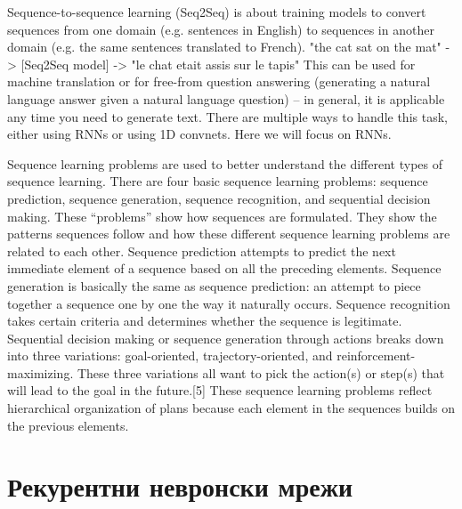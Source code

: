 Sequence-to-sequence learning (Seq2Seq) is about training models to convert sequences from one domain (e.g. sentences in English) to sequences in another domain (e.g. the same sentences translated to French).
"the cat sat on the mat" -> [Seq2Seq model] -> "le chat etait assis sur le tapis"
This can be used for machine translation or for free-from question answering (generating a natural language answer given a natural language question) -- in general, it is applicable any time you need to generate text. There are multiple ways to handle this task, either using RNNs or using 1D convnets. Here we will focus on RNNs.

Sequence learning problems are used to better understand the different types of sequence learning. There are four basic sequence learning problems: sequence prediction, sequence generation, sequence recognition, and sequential decision making. These “problems” show how sequences are formulated. They show the patterns sequences follow and how these different sequence learning problems are related to each other.
Sequence prediction attempts to predict the next immediate element of a sequence based on all the preceding elements. Sequence generation is basically the same as sequence prediction: an attempt to piece together a sequence one by one the way it naturally occurs. Sequence recognition takes certain criteria and determines whether the sequence is legitimate. Sequential decision making or sequence generation through actions breaks down into three variations: goal-oriented, trajectory-oriented, and reinforcement-maximizing. These three variations all want to pick the action(s) or step(s) that will lead to the goal in the future.[5]
These sequence learning problems reflect hierarchical organization of plans because each element in the sequences builds on the previous elements. 

\section{Рекурентни невронски мрежи}

